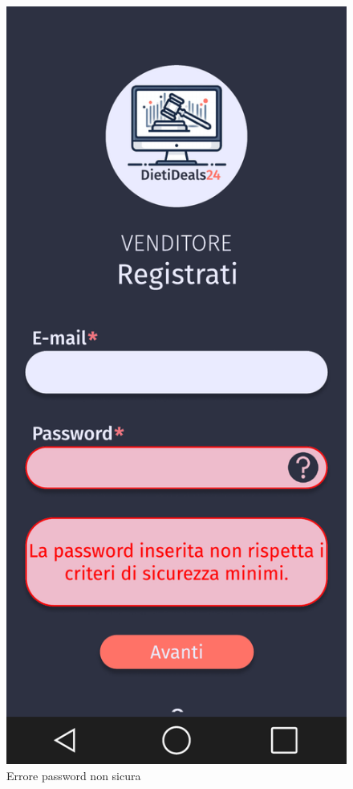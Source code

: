     \begin{figure}[!htb]
        \begin{minipage}{0.32\textwidth}
            \centering
            \includegraphics[width=.7\linewidth]{Immagini/Frames/Errori/E4.pdf}
            \caption{Errore password non sicura}
        \end{minipage}\hfill
        \begin{minipage}{0.32\textwidth}
            \centering

\end{minipage}
\end{figure}
